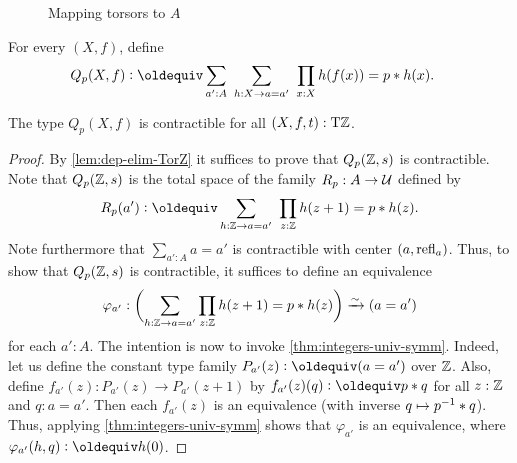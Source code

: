 \documentclass[a4paper,12pt]{amsart}
\begin{document}
\begin{figure}[t]

\caption{\label{fig:TorZ-recursion}Mapping torsors to $A$}
\end{figure}

\begin{definition}\label{def:guided-null-hmtps}
For every $(X,f)$, define
\begin{align*}\label{eq:TBD}
Q_p(X,f)&\defeq \sum_{a':A}~\sum_{h:X\to a=a'}~\prod_{x:X} h(f(x))=p\ct h(x).
\end{align*}
\end{definition}

\begin{lemma}\label{lem:guided-null-hmtps}
The type $Q_p(X,f)$ is contractible for all $(X,f,t):{\mathrm{T}\mathbb{Z}}$.
\end{lemma}
\begin{proof}
  By \cref{lem:dep-elim-TorZ} it suffices to prove that $Q_p(\mathbb{Z},s)$ is contractible.
  Note that $Q_p(\mathbb{Z},s)$ is the total space of the family $R_p : A \to \mathcal{U}$ defined by
  \[
    R_p(a') \defeq \sum_{h:\zet \to a=a'}~\prod_{z:\zet} h(z+1)=p\ct h(z).
  \]
  Note furthermore that $\sum_{a':A} a=a'$ is contractible with center $(a,\mathop{{\mathrm{refl}}_{a}})$.
  Thus, to show that $Q_p(\mathbb{Z},s)$ is contractible,
  it suffices to define an equivalence
  \[
    \varphi_{a'} : \biggl(\sum_{h:\mathbb{Z} \to a=a'}\prod_{z:\mathbb{Z}} h(z+1)=p* h(z)\biggr)
    \xrightarrow{\sim}{} (a=a')
  \]
  for each $a':A$.
  The intention is now to invoke \cref{thm:integers-univ-symm}.
  Indeed, let us define the constant type family $P_{a'}(z)\defeq(a=a')$
  over $\mathbb{Z}$. Also, define $f_{a'}(z) : P_{a'}(z) \to P_{a'}(z+1)$
  by $f_{a'}(z)(q) \defeq p \ct q$ for all $z:\mathbb{Z}$ and $q: a=a'$.
  Then each $f_{a'}(z)$ is an equivalence (with inverse $q \mapsto p^{-1}* q$).
  Thus, applying \cref{thm:integers-univ-symm}
  shows that $\varphi_{a'}$ is an equivalence,
  where $\varphi_{a'}(h,q) \defeq h(0)$.
\end{proof}
\end{document}
